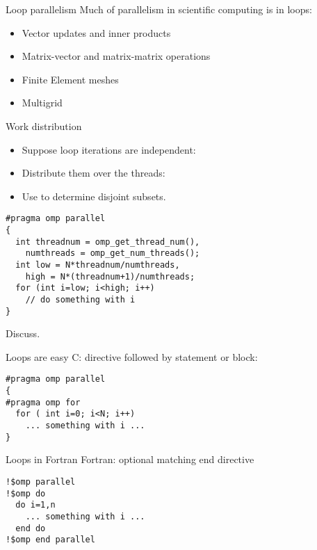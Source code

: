 
\begin{numberedframe}{Loop parallelism}
  Much of parallelism in scientific computing is in loops:
  \begin{itemize}
  \item Vector updates and inner products
  \item Matrix-vector and matrix-matrix operations
  \item Finite Element meshes
  \item Multigrid
  \end{itemize}
\end{numberedframe}

\begin{numberedframe}{Work distribution}
  \begin{itemize}
  \item Suppose loop iterations are independent:
  \item Distribute them over the threads:
  \item Use  to determine disjoint subsets.
  \end{itemize}
\begin{lstlisting}
#pragma omp parallel
{
  int threadnum = omp_get_thread_num(),
    numthreads = omp_get_num_threads();
  int low = N*threadnum/numthreads,
    high = N*(threadnum+1)/numthreads;
  for (int i=low; i<high; i++)
    // do something with i
}
\end{lstlisting}
Discuss.
\end{numberedframe}

\begin{numberedframe}{Loops are easy}
C: directive followed by statement or block:
\begin{lstlisting}
#pragma omp parallel
{
#pragma omp for
  for ( int i=0; i<N; i++)
    ... something with i ...
}
\end{lstlisting}
\end{numberedframe}

\begin{numberedframe}{Loops in Fortran}
Fortran: optional matching end directive
\begin{lstlisting}
!$omp parallel
!$omp do
  do i=1,n
    ... something with i ...
  end do
!$omp end parallel
\end{lstlisting}
\end{numberedframe}

